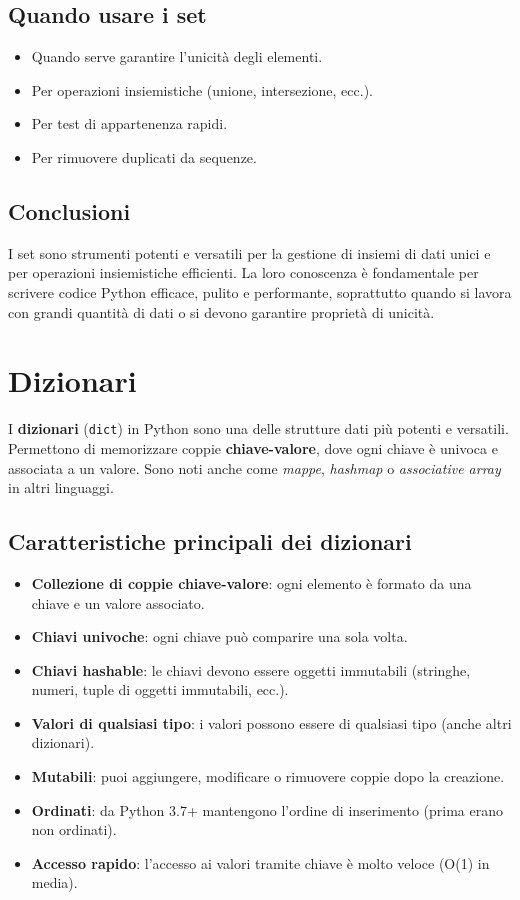 \documentclass[a4paper,12pt]{article}
\begin{document}
\subsection*{Quando usare i set}
\begin{itemize}
    \item Quando serve garantire l'unicità degli elementi.
    \item Per operazioni insiemistiche (unione, intersezione, ecc.).
    \item Per test di appartenenza rapidi.
    \item Per rimuovere duplicati da sequenze.
\end{itemize}

\subsection*{Conclusioni}
I set sono strumenti potenti e versatili per la gestione di insiemi di dati unici e per operazioni insiemistiche efficienti. La loro conoscenza è fondamentale per scrivere codice Python efficace, pulito e performante, soprattutto quando si lavora con grandi quantità di dati o si devono garantire proprietà di unicità.

\section{Dizionari}
I \textbf{dizionari} (\texttt{dict}) in Python sono una delle strutture dati più potenti e versatili. Permettono di memorizzare coppie \textbf{chiave-valore}, dove ogni chiave è univoca e associata a un valore. Sono noti anche come \textit{mappe}, \textit{hashmap} o \textit{associative array} in altri linguaggi.

\subsection*{Caratteristiche principali dei dizionari}
\begin{itemize}
    \item \textbf{Collezione di coppie chiave-valore}: ogni elemento è formato da una chiave e un valore associato.
    \item \textbf{Chiavi univoche}: ogni chiave può comparire una sola volta.
    \item \textbf{Chiavi hashable}: le chiavi devono essere oggetti immutabili (stringhe, numeri, tuple di oggetti immutabili, ecc.).
    \item \textbf{Valori di qualsiasi tipo}: i valori possono essere di qualsiasi tipo (anche altri dizionari).
    \item \textbf{Mutabili}: puoi aggiungere, modificare o rimuovere coppie dopo la creazione.
    \item \textbf{Ordinati}: da Python 3.7+ mantengono l'ordine di inserimento (prima erano non ordinati).
    \item \textbf{Accesso rapido}: l'accesso ai valori tramite chiave è molto veloce (O(1) in media).
\end{itemize}
\end{document}
